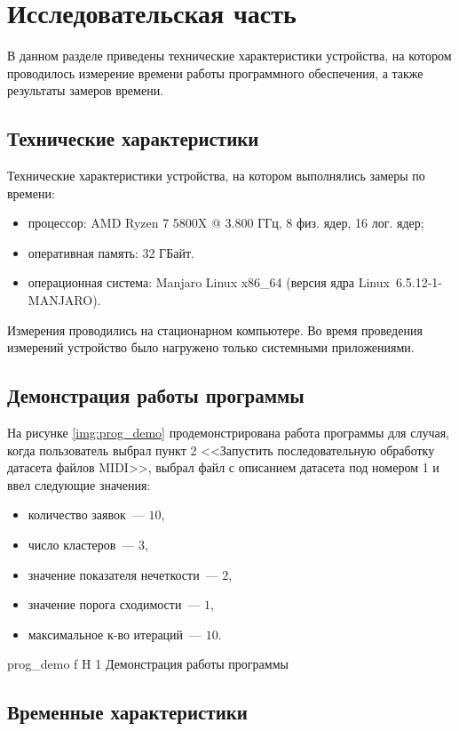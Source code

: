 \chapter{Исследовательская часть}

В данном разделе приведены технические характеристики устройства, на котором проводилось измерение времени работы программного обеспечения, а также результаты замеров времени.

\section{Технические характеристики}

Технические характеристики устройства, на котором выполнялись замеры по времени:
\begin{itemize}
	\item процессор: AMD Ryzen 7 5800X @ 3.800 ГГц, 8 физ. ядер, 16 лог. ядер;
	\item оперативная память: 32 ГБайт.
	\item операционная система: Manjaro Linux x86\_64 (версия ядра Linux~6.5.12-1-MANJARO).
\end{itemize}

Измерения проводились на стационарном компьютере.
Во время проведения измерений устройство было нагружено только системными приложениями.

\section{Демонстрация работы программы}

На рисунке \ref{img:prog_demo} продемонстрирована работа программы для случая, когда пользователь выбрал пункт 2 <<Запустить последовательную обработку датасета файлов MIDI>>, выбрал файл с описанием датасета под номером 1 и ввел следующие значения:
\begin{itemize}
	\item количество заявок~--- $10$,
	\item число кластеров~--- $3$,
	\item значение показателя нечеткости~--- $2$,
	\item значение порога сходимости~--- $1$,
	\item максимальное к-во итераций~--- $10$.
\end{itemize}

	{prog_demo}
	{f}
	{H}
	{1\textwidth}
	{Демонстрация работы программы}

\section{Временные характеристики}

